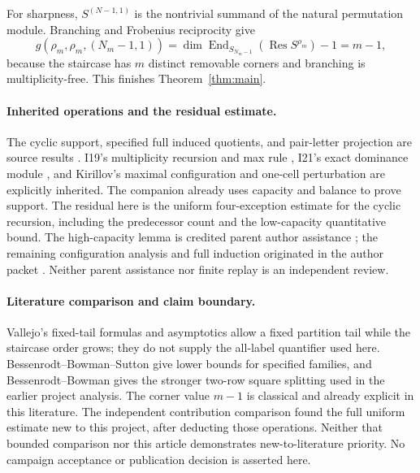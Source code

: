 \documentclass[11pt]{article}
\theoremstyle{remark}\newtheorem{remark}[theorem]{Remark}
\newcommand{\Res}{\operatorname{Res}}\newcommand{\Hom}{\operatorname{Hom}}
\newcommand{\End}{\operatorname{End}}\newcommand{\len}{\ell}
\numberwithin{equation}{section}\setlength{\emergencystretch}{2em}
\begin{document}
For sharpness, $S^{(N-1,1)}$ is the nontrivial summand of the natural
permutation module. Branching and Frobenius reciprocity give
\[
 g(\rho_m,\rho_m,(N_m-1,1))
 =\dim\End_{S_{N_m-1}}(\Res S^{\rho_m})-1=m-1,
\]
because the staircase has $m$ distinct removable corners and branching
is multiplicity-free. This finishes Theorem~\ref{thm:main}.

\paragraph{Inherited operations and the residual estimate.}
The cyclic support, specified full induced quotients, and pair-letter
projection are source results \cite{cyclic}. I19's multiplicity recursion
and max rule \cite{I19}, I21's exact dominance module \cite{I21}, and
Kirillov's maximal configuration and one-cell perturbation \cite{Kirillov}
are explicitly inherited. The companion \cite{universal} already uses
capacity and balance to prove support. The residual here is the uniform
four-exception estimate for the cyclic recursion, including the predecessor
count and the low-capacity quantitative bound. The high-capacity lemma is
credited parent author assistance \cite{parenthigh}; the remaining
configuration analysis and full induction originated in the author packet
\cite{authorpacket}. Neither parent assistance nor finite replay is an
independent review.

\paragraph{Literature comparison and claim boundary.}
Vallejo's fixed-tail formulas and asymptotics \cite[Section~8]{Vallejo}
allow a fixed partition tail while the staircase order grows; they do not
supply the all-label quantifier used here. Bessenrodt--Bowman--Sutton
\cite[Section~5]{BBS} give lower bounds for specified families, and
Bessenrodt--Bowman \cite[Theorem~7.11]{BB} gives the stronger two-row
square splitting used in the earlier project analysis. The corner value
$m-1$ is classical and already explicit in this literature. The independent
contribution comparison found the full uniform estimate new to this project,
after deducting those operations. Neither that bounded comparison nor this
article demonstrates new-to-literature priority. No campaign acceptance
or publication decision is asserted here.
\end{document}
